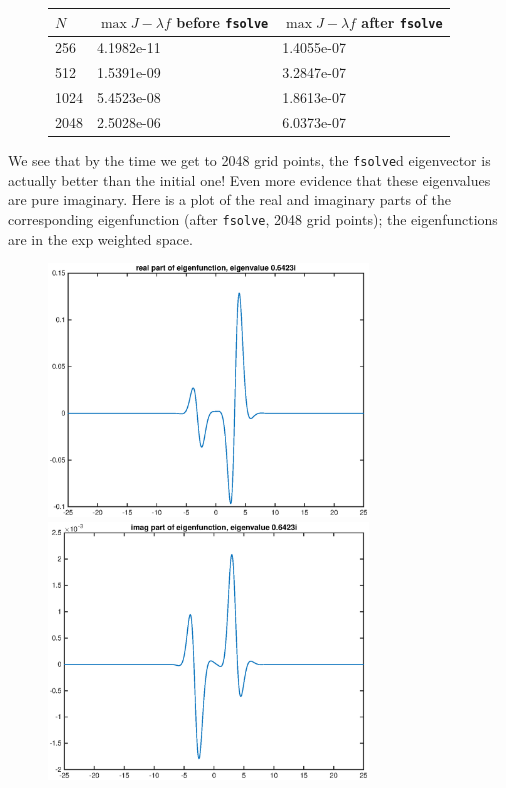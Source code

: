 \documentclass[12pt]{article}
\begin{document}
\begin{figure}[H]
\begin{tabular}{l|ll}
  $N$   &  $\max J -\lambda f$ before \texttt{fsolve}  &  $\max J -\lambda f$ after \texttt{fsolve} \\ \hline
  256   &     4.1982e-11 &   1.4055e-07   \\ 
  512   &     1.5391e-09 &   3.2847e-07   \\ 
  1024  &     5.4523e-08 &   1.8613e-07   \\
  2048  &     2.5028e-06 &   6.0373e-07   \\
\end{tabular}
\end{figure}
We see that by the time we get to 2048 grid points, the \texttt{fsolve}d eigenvector is actually better than the initial one! Even more evidence that these eigenvalues are pure imaginary. Here is a plot of the real and imaginary parts of the corresponding eigenfunction (after \texttt{fsolve}, 2048 grid points); the eigenfunctions are in the exp weighted space.
\begin{figure}[H]
\includegraphics[width=8.5cm]{1double2eigenfnreal}
\includegraphics[width=8.5cm]{1double2eigenfnimag}
\end{figure}
\end{document}
